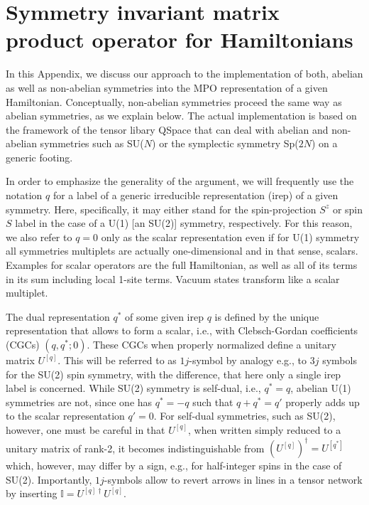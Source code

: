 \documentclass[aps,prx,twocolumn,showpacs,psfig,superscriptaddress,longbibliography]{revtex4-1}
\begin{document}

\section{Symmetry invariant matrix product operator for Hamiltonians}
\label{App:SYMPO}

In this Appendix, we discuss our approach to the implementation of
both, abelian as well as non-abelian symmetries into the MPO
representation of a given Hamiltonian. Conceptually, non-abelian
symmetries proceed the same way as abelian symmetries, as we explain
below.  The actual implementation is based on the framework of the
tensor libary QSpace \cite{Weichselbaum.a:2012:QSpace} that can deal
with abelian and non-abelian symmetries such as SU($N$) or the
symplectic symmetry Sp($2N$) on a generic footing.
 
In order to emphasize the generality of the argument, we will
frequently use the notation $q$ for a label of a generic irreducible
representation (irep) of a given symmetry. Here, specifically, it
may either stand for the spin-projection $S^z$ or spin $S$ label in
the case of a U(1) [an SU(2)] symmetry, respectively. For this
reason, we also refer to $q=0$ only as the scalar representation
even if for U(1) symmetry all symmetries multiplets are actually
one-dimensional and in that sense, scalars.  Examples for scalar
operators are the full Hamiltonian, as well as all of its terms in
its sum including local 1-site terms. Vacuum states transform like a
scalar multiplet.

The dual representation $q^\ast$ of some given irep $q$ is defined
by the unique representation that allows to form a scalar, i.e.,
with Clebsch-Gordan coefficients (CGCs) $(q,q^\ast;0)$. These CGCs
when properly normalized define a unitary matrix $U^{[q]}$. This
will be referred to as $1j$-symbol by analogy e.g., to $3j$ symbols
for the SU(2) spin symmetry, with the difference, that here only a
single irep label is concerned.  While SU(2) symmetry is self-dual,
i.e., $q^\ast=q$, abelian U(1) symmetries are not, since one has
$q^\ast=-q$ such that $q+q^\ast = q'$ properly adds up to the
scalar representation $q'=0$.  For self-dual symmetries, such as
SU(2), however, one must be careful in that $U^{[q]}$, when written
simply reduced to a unitary matrix of rank-2, it becomes
indistinguishable from $(U^{[q]})^\dagger = U^{[q^\ast]}$ which,
however, may differ by a sign, e.g., for half-integer spins in the
case of SU(2). Importantly, $1j$-symbols allow to revert arrows in
lines in a tensor network by inserting $\mathbb{I} = U^{[q]\dagger}
U^{[q]}$.
\end{document}
